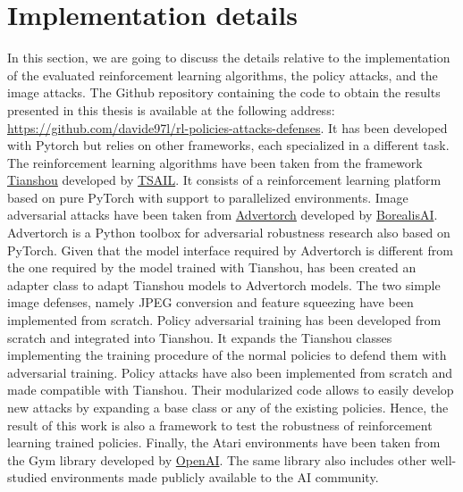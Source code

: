 \section{Implementation details}
In this section, we are going to discuss the details relative to the implementation of the evaluated reinforcement learning algorithms, the policy attacks, and the image attacks. The Github repository containing the code to obtain the results presented in this thesis is available at the following address: \url{https://github.com/davide97l/rl-policies-attacks-defenses}. It has been developed with Pytorch but relies on other frameworks, each specialized in a different task. The reinforcement learning algorithms have been taken from the framework \href{https://github.com/davide97l/rl-policies-attacks-defenses}{Tianshou} \cite{tianshou} developed by \href{http://ml.cs.tsinghua.edu.cn/}{TSAIL}. It consists of a reinforcement learning platform based on pure PyTorch with support to parallelized environments. Image adversarial attacks have been taken from \href{https://github.com/BorealisAI/advertorch}{Advertorch} \cite{ding2019advertorch} developed by \href{https://www.borealisai.com/en/}{BorealisAI}. Advertorch is a Python toolbox for adversarial robustness research also based on PyTorch. Given that the model interface required by Advertorch is different from the one required by the model trained with Tianshou, has been created an adapter class to adapt Tianshou models to Advertorch models. The two simple image defenses, namely JPEG conversion and feature squeezing have been implemented from scratch. Policy adversarial training has been developed from scratch and integrated into Tianshou. It expands the Tianshou classes implementing the training procedure of the normal policies to defend them with adversarial training. Policy attacks have also been implemented from scratch and made compatible with Tianshou. Their modularized code allows to easily develop new attacks by expanding a base class or any of the existing policies. Hence, the result of this work is also a framework to test the robustness of reinforcement learning trained policies. Finally, the Atari environments have been taken from the Gym library developed by \href{https://openai.com/}{OpenAI}. The same library also includes other well-studied environments made publicly available to the AI community.

